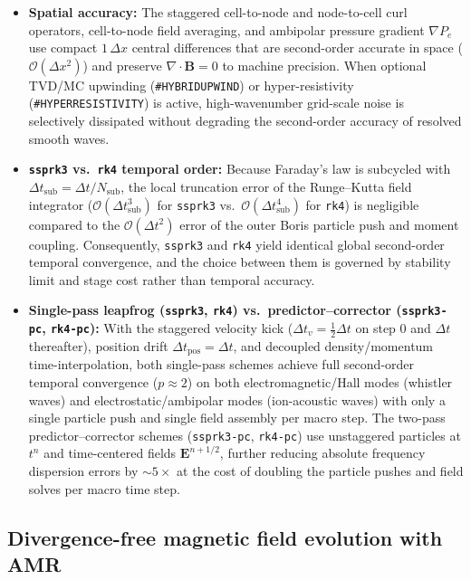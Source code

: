 \documentclass[a4paper, 11pt]{article}
\begin{document}
\begin{itemize}
  \item \textbf{Spatial accuracy:} The staggered cell-to-node and node-to-cell curl operators, cell-to-node field averaging, and ambipolar pressure gradient $\nabla P_e$ use compact $1\,\Delta x$ central differences that are second-order accurate in space ($\mathcal{O}(\Delta x^2)$) and preserve $\nabla\cdot\mathbf{B} = 0$ to machine precision. When optional TVD/MC upwinding (\texttt{\#HYBRIDUPWIND}) or hyper-resistivity (\texttt{\#HYPERRESISTIVITY}) is active, high-wavenumber grid-scale noise is selectively dissipated without degrading the second-order accuracy of resolved smooth waves.
  \item \textbf{\texttt{ssprk3} vs.\ \texttt{rk4} temporal order:} Because Faraday's law is subcycled with $\Delta t_{\text{sub}} = \Delta t / N_{\text{sub}}$, the local truncation error of the Runge--Kutta field integrator ($\mathcal{O}(\Delta t_{\text{sub}}^3)$ for \texttt{ssprk3} vs.\ $\mathcal{O}(\Delta t_{\text{sub}}^4)$ for \texttt{rk4}) is negligible compared to the $\mathcal{O}(\Delta t^2)$ error of the outer Boris particle push and moment coupling. Consequently, \texttt{ssprk3} and \texttt{rk4} yield identical global second-order temporal convergence, and the choice between them is governed by stability limit and stage cost rather than temporal accuracy.
  \item \textbf{Single-pass leapfrog (\texttt{ssprk3}, \texttt{rk4}) vs.\ predictor--corrector (\texttt{ssprk3-pc}, \texttt{rk4-pc}):}
  With the staggered velocity kick ($\Delta t_v = \tfrac{1}{2}\Delta t$ on step 0 and $\Delta t$ thereafter), position drift $\Delta t_{\text{pos}} = \Delta t$, and decoupled density/momentum time-interpolation, both single-pass schemes achieve full second-order temporal convergence ($p \approx 2$) on both electromagnetic/Hall modes (whistler waves) and electrostatic/ambipolar modes (ion-acoustic waves) with only a single particle push and single field assembly per macro step.
  The two-pass predictor--corrector schemes (\texttt{ssprk3-pc}, \texttt{rk4-pc}) use unstaggered particles at $t^n$ and time-centered fields $\mathbf{E}^{n+1/2}$, further reducing absolute frequency dispersion errors by $\sim 5\times$ at the cost of doubling the particle pushes and field solves per macro time step.
\end{itemize}

\subsection{Divergence-free magnetic field evolution with AMR}
\end{document}
